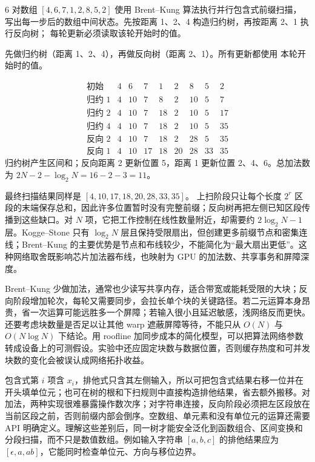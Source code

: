 \begin{solutionexercise}{6}
\problemheading 对数组 $[4,6,7,1,2,8,5,2]$ 使用 Brent--Kung 算法执行并行包含式前缀扫描，
写出每一步后的数组中间状态。先按距离 1、2、4 构造归约树，再按距离 2、1 执行反向树；
每轮更新必须读取该轮开始时的值。

\approachheading 先做归约树（距离 1、2、4），再做反向树（距离 2、1）。所有更新都使用
本轮开始时的值。

\answerheading
\[
\begin{array}{c|rrrrrrrr}
\text{初始}&4&6&7&1&2&8&5&2\\
\text{归约 }1&4&10&7&8&2&10&5&7\\
\text{归约 }2&4&10&7&18&2&10&5&17\\
\text{归约 }4&4&10&7&18&2&10&5&35\\
\text{反向 }2&4&10&7&18&2&28&5&35\\
\text{反向 }1&4&10&17&18&20&28&33&35
\end{array}
\]
归约树产生区间和；反向距离 2 更新位置 5，距离 1 更新位置 2、4、6。总加法数为
$2N-2-\log_2N=16-2-3=11$。

\conclusionheading 最终扫描结果同样是 $[4,10,17,18,20,28,33,35]$。
\discussionheading
{}上扫阶段只让每个长度 $2^r$ 区段的末端保存总和，因此许多位置暂时没有完整前缀；反向树再把左侧已知区段传播到这些缺口。对 $N$ 项，它把工作控制在线性数量附近，却需要约 $2\log_2N-1$ 层。Kogge--Stone 只有 $\log_2N$ 层且保持受限扇出，但创建更多前缀节点和密集连线；Brent--Kung 的主要优势是节点和布线较少，不能简化为“最大扇出更低”。这种网络取舍既影响芯片加法器布线，也映射为 GPU 的加法数、共享事务和屏障深度。

Brent--Kung 少做加法，通常也少读写共享内存，适合带宽或能耗受限的大块；反向阶段增加轮次，每轮又需要同步，会拉长单个块的关键路径。若二元运算本身昂贵，省一次运算可能远胜多一个屏障；若输入很小且延迟敏感，浅网络反而更快。还要考虑块数量是否足以让其他 warp 遮蔽屏障等待，不能只从 $O(N)$ 与 $O(N\log N)$ 下结论。用 roofline 加同步成本的简化模型，可以把算法网络参数转成设备上的可测假设。实验中还应固定块数与数据位置，否则缓存热度和可并发块数的变化会被误认成网络拓扑收益。

包含式第 $i$ 项含 $x_i$，排他式只含其左侧输入，所以可把包含式结果右移一位并在开头填单位元；也可在树的根和下扫规则中直接构造排他结果，省去额外搬移。对加法，两种实现很难暴露操作数次序；对字符串连接，反向阶段必须把左区段放在当前区段之前，否则前缀内部会倒序。空数组、单元素和没有单位元的运算还需要 API 明确定义。理解这些差别后，同一树才能安全泛化到函数组合、区间变换和分段扫描，而不只是数值数组。例如输入字符串 $[a,b,c]$ 的排他结果应为 $[\epsilon,a,ab]$，它能同时检查单位元、方向与移位边界。


\end{solutionexercise}
